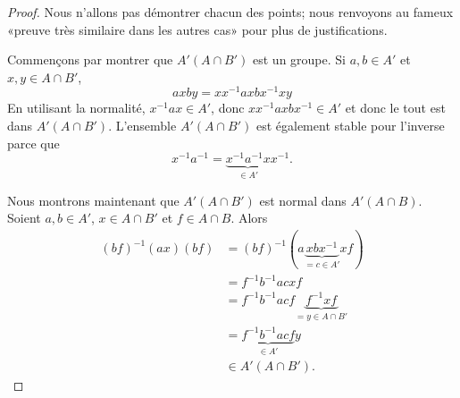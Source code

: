 \begin{proof}
    Nous n'allons pas démontrer chacun des points; nous renvoyons au fameux «preuve très similaire dans les autres cas» pour plus de justifications.

    Commençons par montrer que \( A'(A\cap B')\) est un groupe. Si \( a,b\in A'\) et \( x,y\in A\cap B'\),
    \begin{equation}
        axby=xx^{-1}axbx^{-1}xy
    \end{equation}
    En utilisant la normalité, \( x^{-1}ax\in A'\), donc \( xx^{-1}axbx^{-1}\in A'\) et donc le tout est dans \( A'(A\cap B')\). L'ensemble \( A'(A\cap B')\) est également stable pour l'inverse parce que
    \begin{equation}
        x^{-1}a^{-1}=\underbrace{x^{-1}a^{-1}x}_{\in A'}x^{-1}.
    \end{equation}
    
    Nous montrons maintenant que \( A'(A\cap B')\) est normal dans \( A'(A\cap B)\). Soient \( a,b\in A'\), \( x\in A\cap B'\) et \( f\in A\cap B\). Alors
    \begin{subequations}
        \begin{align}
        (bf)^{-1}(ax)(bf)&=(bf)^{-1}(a\underbrace{xbx^{-1}}_{=c\in A'}xf)\\
        &=f^{-1}b^{-1}acxf\\
        &=f^{-1}b^{-1}acf\underbrace{f^{-1}xf}_{=y\in A\cap B'}\\
        &=\underbrace{f^{-1}b^{-1}acf}_{\in A'}y\\
        &\in A'(A\cap B').
        \end{align}
    \end{subequations}
    

\end{proof}
